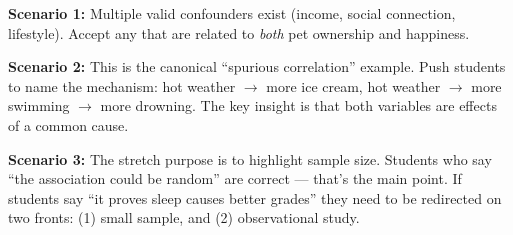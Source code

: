 \documentclass[10pt]{article}
\begin{document}
\vspace{0.12in}
\begin{teachernote}
\textbf{Scenario 1:} Multiple valid confounders exist (income, social connection, lifestyle).
Accept any that are related to \emph{both} pet ownership and happiness.

\textbf{Scenario 2:} This is the canonical ``spurious correlation'' example.
Push students to name the mechanism: hot weather $\to$ more ice cream, hot weather $\to$
more swimming $\to$ more drowning. The key insight is that both variables are effects
of a common cause.

\textbf{Scenario 3:} The stretch purpose is to highlight sample size.
Students who say ``the association could be random'' are correct --- that's the main point.
If students say ``it proves sleep causes better grades'' they need to be redirected on two fronts:
(1) small sample, and (2) observational study.
\end{teachernote}
\end{document}
